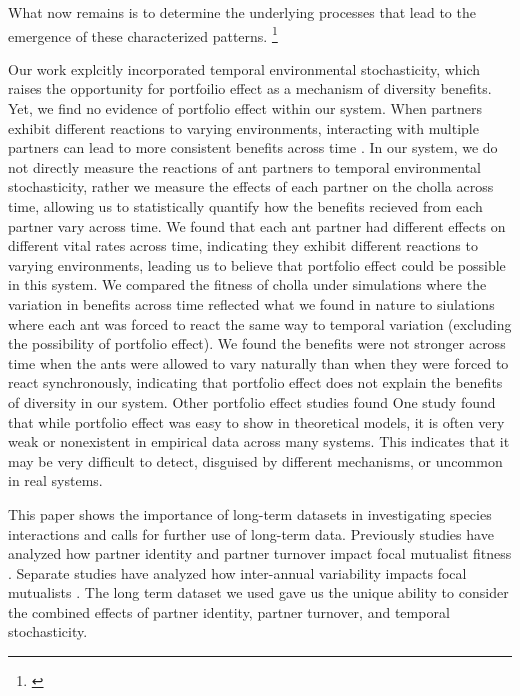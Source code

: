 \documentclass[11pt]{article}
\newcommand{\ali}[2]{{\color{blue}{#1}}\footnote{\textit{\color{blue}{#2}}}}
\begin{document}
What now remains is to determine the underlying processes that lead to the emergence of these characterized patterns. 
\ali{}{Find papers about the processes which drive these patterns in other papers -- invertase lit}

Our work explcitly incorporated temporal environmental stochasticity, which raises the opportunity for portfoilio effect as a mechanism of diversity benefits. Yet, we find no evidence of portfolio effect within our system. 
When partners exhibit different reactions to varying environments, interacting with multiple partners can lead to more consistent benefits across time \citep{Batstone2018}.
In our system, we do not directly measure the reactions of ant partners to temporal environmental stochasticity, rather we measure the effects of each partner on the cholla across time, allowing us to statistically quantify how the benefits recieved from each partner vary across time.
We found that each ant partner had different effects on different vital rates across time,  indicating they exhibit different reactions to varying environments, leading us to believe that portfolio effect could be possible in this system. 
We compared the fitness of cholla under simulations where the variation in benefits across time reflected what we found in nature to siulations where each ant was forced to react the same way to temporal variation (excluding the possibility of portfolio effect).
We found the benefits were not stronger across time when the ants were allowed to vary naturally than when they were forced to react synchronously, indicating that portfolio effect does not explain the benefits of diversity in our system.
Other portfolio effect studies \citep{Lazaro2022,Tornos2023} found 
One study \cite{Dallas2021} found that while portfolio effect was easy to show in theoretical models, it is often very weak or nonexistent in empirical data across many systems. 
This indicates that it may be very difficult to detect, disguised by different mechanisms, or uncommon in real systems.

This paper shows the importance of long-term datasets in investigating species interactions and calls for further use of long-term data. 
Previously studies have analyzed how partner identity and partner turnover impact focal mutualist fitness \cite{Fonseca2003, Dejean2008, Noe1994, Barrett2015, Bruna2014, Trojelsgaard2015}.
Separate studies have analyzed how inter-annual variability impacts focal mutualists \cite{Alonso1998, Alarcon2008, Ollerton2006, Horvitz1990, Lazaro2022}.
The long term dataset we used gave us the unique ability to consider the combined effects of partner identity, partner turnover, and temporal stochasticity.
\end{document}
